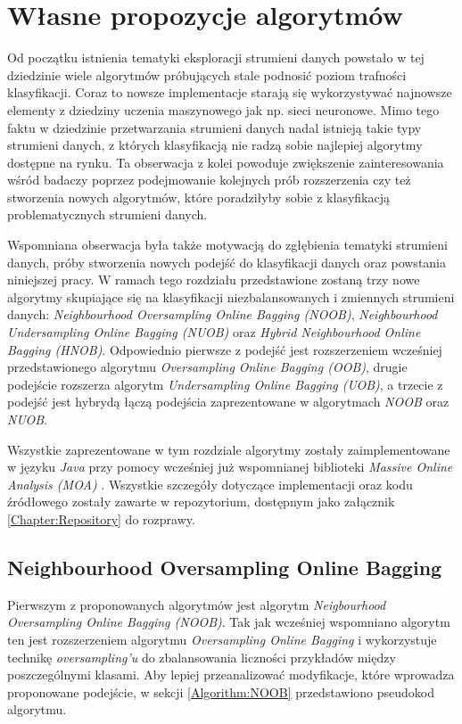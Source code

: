 \chapter{Własne propozycje algorytmów}

\noindent Od początku istnienia tematyki eksploracji strumieni danych powstało w tej dziedzinie wiele algorytmów próbujących stale podnosić poziom trafności klasyfikacji. Coraz to nowsze implementacje starają się wykorzystywać najnowsze elementy z dziedziny uczenia maszynowego jak np. sieci neuronowe. Mimo tego faktu w dziedzinie przetwarzania strumieni danych nadal istnieją takie typy strumieni danych, z których klasyfikacją nie radzą sobie najlepiej algorytmy dostępne na rynku. Ta obserwacja z kolei powoduje zwiększenie zainteresowania wśród badaczy poprzez podejmowanie kolejnych prób rozszerzenia czy też stworzenia nowych algorytmów, które poradziłyby sobie z klasyfikacją problematycznych strumieni danych.

Wspomniana obserwacja była także motywacją do zgłębienia tematyki strumieni danych, próby stworzenia nowych podejść do klasyfikacji danych oraz powstania niniejszej pracy. W ramach tego rozdziału przedstawione zostaną trzy nowe algorytmy skupiające się na klasyfikacji niezbalansowanych i zmiennych strumieni danych: \textit{Neighbourhood Oversampling Online Bagging (NOOB)}, \textit{Neighbourhood Undersampling Online Bagging (NUOB)} oraz \textit{Hybrid Neighbourhood Online Bagging (HNOB)}. Odpowiednio pierwsze z podejść jest rozszerzeniem wcześniej przedstawionego algorytmu \textit{Oversampling Online Bagging (OOB)}, drugie podejście rozszerza algorytm \textit{Undersampling Online Bagging (UOB)}, a trzecie z podejść jest hybrydą łączą podejścia zaprezentowane w algorytmach \textit{NOOB} oraz \textit{NUOB}.

Wszystkie zaprezentowane w tym rozdziale algorytmy zostały zaimplementowane w języku \textit{Java} przy pomocy wcześniej już wspomnianej biblioteki \textit{Massive Online Analysis (MOA)} \cite{Article:MOA}. Wszystkie szczegóły dotyczące implementacji oraz kodu źródłowego zostały zawarte w repozytorium, dostępnym jako załącznik \ref{Chapter:Repository} do rozprawy.

\newpage

\section{Neighbourhood Oversampling Online Bagging}

\noindent Pierwszym z proponowanych algorytmów jest algorytm \textit{Neigbourhood Oversampling Online Bagging (NOOB)}. Tak jak wcześniej wspomniano algorytm ten jest rozszerzeniem algorytmu \textit{Oversampling Online Bagging} i wykorzystuje technikę \textit{oversampling'u} do zbalansowania liczności przykładów między poszczególnymi klasami. Aby lepiej przeanalizować modyfikacje, które wprowadza proponowane podejście, w sekcji \ref{Algorithm:NOOB} przedstawiono pseudokod algorytmu.


